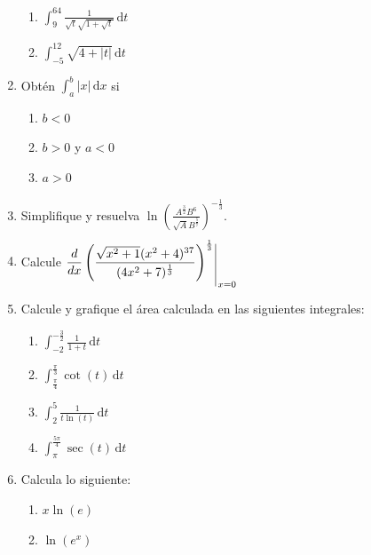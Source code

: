 \documentclass{article}
\makeatletter
\numberwithin{equation}{section}
\newcommand{\integrate}[4]{\int_{#1}^{#2} \! {#3} \, \mathrm{d} {#4}}
\newcommand\eval[1]{\begin{array}[t]{@{}c@{\,}|@{\,}}%
\raisebox{0pt}[0.85\height][1.33\depth]{$ \displaystyle#1 $}\end{array}}
\makeatother
\begin{document}
\begin{enumerate}
        \setlength{\columnsep}{-0.6in}
        \begin{multicols}{2}
            \begin{enumerate}
                \item $\integrate{9}{64}{\frac{1}{\sqrt{t}\sqrt{1+\sqrt{t}}}}{t}$
                \item $\integrate{-5}{12}{\sqrt{4+|t|}}{t}$
            \end{enumerate}
        \end{multicols}
    \item Obtén $\integrate{a}{b}{|x|}{x}$ si
        \setlength{\columnsep}{-0.6in}
        \begin{multicols}{2}
            \begin{enumerate}
                \item $b<0$
                \item $b>0$ y $a<0$
                \item $a>0$
            \end{enumerate}
        \end{multicols}
    \item Simplifique y resuelva $\ln{\left(\frac{A^{\frac{3}{2}}B^6}{\sqrt{A}B^{\frac{5}{7}}}\right)^{-\frac{1}{3}}}$.
    \item Calcule $\eval{\frac{d}{dx}\left(\frac{\sqrt{x^2+1}(x^2+4)^{37}}{(4x^2+7)^{\frac{1}{3}}}\right)^{\frac{1}{3}}}_{x=0}$
    \item Calcule y grafique el área calculada en las siguientes integrales:
        \begin{multicols}{2}
            \begin{enumerate}
                \item $\integrate{-2}{-\frac{3}{2}}{\frac{1}{1+t}}{t}$
                \item $\integrate{\frac{\pi}{4}}{\frac{\pi}{3}}{\cot(t)}{t}$
                \item $\integrate{2}{5}{\frac{1}{t\ln (t)}}{t}$
                \item $\integrate{\pi}{\frac{5\pi}{4}}{\sec (t)}{t}$
            \end{enumerate}
        \end{multicols}
    \item Calcula lo siguiente:
        \begin{multicols}{2}
            \begin{enumerate}
                \item $x\ln(e)$
                \item $\ln(e^x)$

\end{enumerate}
\end{multicols}
\end{enumerate}
\end{document}
